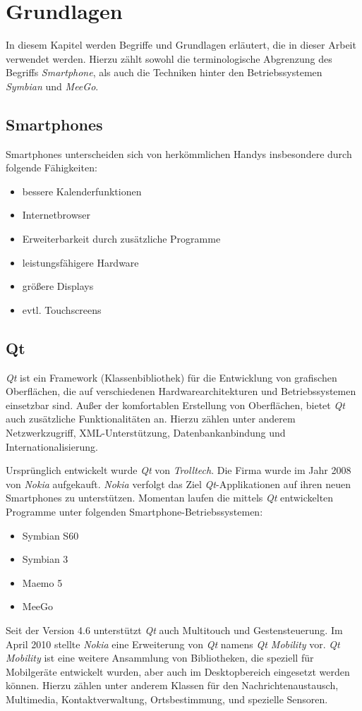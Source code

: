 \section{Grundlagen}

In diesem Kapitel werden Begriffe und Grundlagen erläutert, die in dieser Arbeit verwendet werden. Hierzu zählt sowohl die terminologische Abgrenzung des Begriffs \emph{Smartphone}, als auch die Techniken hinter den Betriebssystemen \emph{Symbian} und \emph{MeeGo}.

\subsection{Smartphones}

Smartphones unterscheiden sich von herkömmlichen Handys insbesondere durch folgende Fä\-hig\-kei\-ten:
\begin{itemize}
	\item bessere Kalenderfunktionen
	\item Internetbrowser
	\item Erweiterbarkeit durch zusätzliche Programme
	\item leistungsfähigere Hardware
	\item größere Displays
	\item evtl. Touchscreens
\end{itemize}

\subsection{Qt}
\emph{Qt} ist ein Framework (Klassenbibliothek) für die Entwicklung von grafischen Oberflächen, die auf verschiedenen Hardwarearchitekturen und Betriebssystemen einsetzbar sind. Außer der komfortablen Erstellung von Oberflächen, bietet \emph{Qt} auch zusätzliche Funktionalitäten an. Hierzu zählen unter anderem Netzwerkzugriff, XML-Unterstützung, Datenbankanbindung und Internationalisierung.

Ursprünglich entwickelt wurde \emph{Qt} von \emph{Trolltech}. Die Firma wurde im Jahr 2008 von \emph{Nokia} aufgekauft. \emph{Nokia} verfolgt das Ziel \emph{Qt}-Applikationen auf ihren neuen Smartphones zu unterstützen. Momentan laufen die mittels \emph{Qt} entwickelten Programme unter folgenden Smartphone-Betriebssystemen:
\begin{itemize}
	\item Symbian S60
	\item Symbian 3
	\item Maemo 5
	\item MeeGo
\end{itemize}
Seit der Version 4.6 unterstützt \emph{Qt} auch Multitouch und Gestensteuerung. Im April 2010 stellte \emph{Nokia} eine Erweiterung von \emph{Qt} namens \emph{Qt Mobility} vor. \emph{Qt Mobility} ist eine weitere Ansammlung von Bibliotheken, die speziell für Mobilgeräte entwickelt wurden, aber auch im Desktopbereich eingesetzt werden können. Hierzu zählen unter anderem Klassen für den Nachrichtenaustausch, Multimedia, Kontaktverwaltung, Ortsbestimmung, und spezielle Sensoren.

